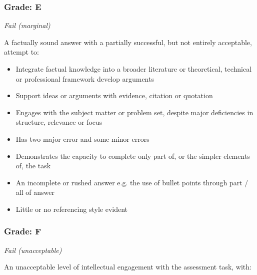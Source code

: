 \documentclass[12pt,a4paper]{article}
\begin{document}
\subsubsection*{Grade: E}

\textit{Fail (marginal)}

A factually sound answer with a partially successful, but not entirely acceptable, attempt to:

\begin{itemize}
	\item Integrate factual knowledge into a broader literature or theoretical, technical or professional framework develop arguments
	\item Support ideas or arguments with evidence, citation or quotation
	\item Engages with the subject matter or
	problem set, despite major
	deficiencies in structure, relevance or focus
	\item Has two major error and some minor
	errors
	\item Demonstrates the capacity to
	complete only part of, or the simpler
	elements of, the task
	\item An incomplete or rushed answer e.g.
	the use of bullet points through part /
	all of answer
	\item Little or no referencing style evident
\end{itemize}

\subsubsection*{Grade: F}

\textit{Fail (unacceptable)}

An unacceptable level of intellectual engagement with
the assessment task, with:
\end{document}
